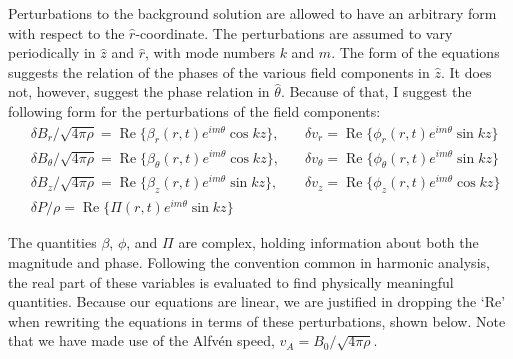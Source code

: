 \documentclass[letterpaper]{article}
\begin{document}
Perturbations to the background solution are allowed to have an
arbitrary form with respect to the $\hat{r}$-coordinate.  The
perturbations are assumed to vary periodically in $\hat{z}$ and
$\hat{r}$, with mode numbers $k$ and $m$.  The form of the equations
suggests the relation of the phases of the various field components in
$\hat{z}$.  It does not, however, suggest the phase relation in
$\hat{\theta}$.  Because of that, I suggest the following form for the
perturbations of the field components:
\begin{align}
&\delta B_r / \sqrt{4\pi\rho} = \operatorname{Re}\{\beta_r (r,t)e^{im\theta}\cos{kz}\},\quad
&\delta v_r = \operatorname{Re}\{\phi_r (r,t) e^{im\theta} \sin{kz}\}
\nonumber \\
&\delta B_\theta / \sqrt{4\pi\rho} = \operatorname{Re}\{\beta_\theta (r,t)e^{im\theta}\cos{kz}\},\quad
&\delta v_\theta = \operatorname{Re}\{\phi_\theta (r,t) e^{im\theta} \sin{kz}\}
\nonumber \\
&\delta B_z / \sqrt{4\pi\rho} = \operatorname{Re}\{\beta_z (r,t)e^{im\theta}\sin{kz}\},\quad
&\delta v_z = \operatorname{Re}\{\phi_z (r,t) e^{im\theta} \cos{kz}\}
\nonumber \\
&\delta P / \rho = \operatorname{Re}\{\Pi (r,t) e^{im\theta} \sin{kz}\}&
\end{align}

The quantities $\beta$, $\phi$, and $\Pi$ are complex, holding
information about both the magnitude and phase. Following the
convention common in harmonic analysis, the real part of these
variables is evaluated to find physically meaningful
quantities. Because our equations are linear, we are justified in
dropping the `$\mathrm{Re}$' when rewriting the equations in terms of
these perturbations, shown below. Note that we have made use of the
Alfv\'{e}n speed, $v_A = B_0/\sqrt{4\pi\rho}$.
\end{document}
